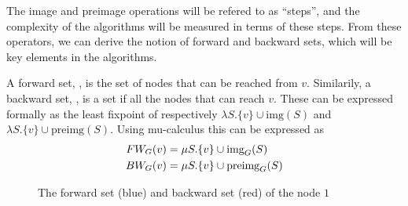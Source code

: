 \documentclass[../master/master.tex]{subfiles}
\begin{document}
The image and preimage operations will be refered to as ``steps'', and the complexity of the algorithms will be measured in terms of these steps. 
From these operators, we can derive the notion of forward and backward sets, which will be key elements in the algorithms.

A forward set, , is the set of nodes that can be reached from $v$. Similarily, a backward set, , is a set if all the nodes that can reach $v$. These can be expressed formally as the least fixpoint of respectively $\lambda S.\{v\}\cup \text{img}(S)$ and $\lambda S.\{v\}\cup \text{preimg}(S)$. Using mu-calculus \cite{clarke_peled_grumberg_1999} this can be expressed as 
\begin{align}\label{fw}
FW_{G}(v) &= \mu S.\{v\}\cup \text{img}_G(S)\\
\label{bw}BW_{G}(v) &= \mu S.\{v\}\cup \text{preimg}_G(S)
\end{align}

\begin{figure}[H]
\center
{}
\caption{The forward set (blue) and backward set (red) of the node $1$ }
\label{fwbw}
\end{figure}
\end{document}
